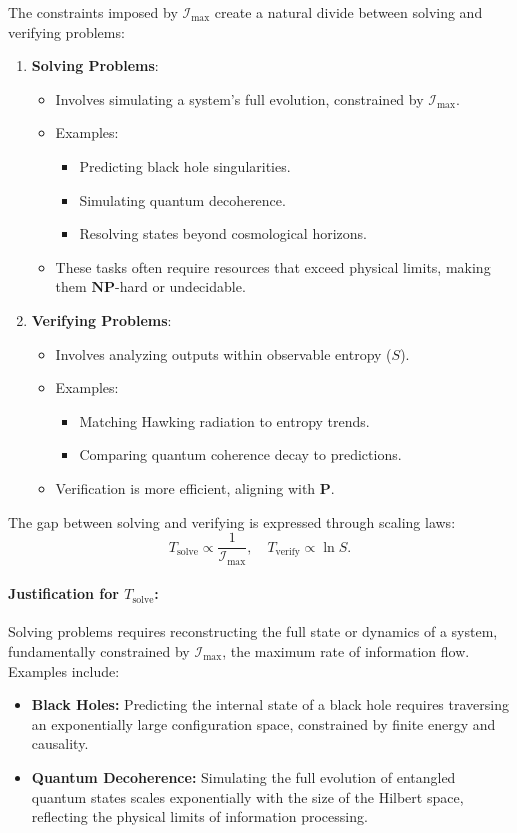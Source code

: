\documentclass[12pt]{article}
\begin{document}
The constraints imposed by \(\mathcal{I}_{\text{max}}\) create a natural divide between solving and verifying problems:
\begin{enumerate}
    \item \textbf{Solving Problems}:
    \begin{itemize}
        \item Involves simulating a system’s full evolution, constrained by \(\mathcal{I}_{\text{max}}\).
        \item Examples:
        \begin{itemize}
            \item Predicting black hole singularities.
            \item Simulating quantum decoherence.
            \item Resolving states beyond cosmological horizons.
        \end{itemize}
        \item These tasks often require resources that exceed physical limits, making them \(\mathbf{NP}\)-hard or undecidable.
    \end{itemize}

    \item \textbf{Verifying Problems}:
    \begin{itemize}
        \item Involves analyzing outputs within observable entropy (\(S\)).
        \item Examples:
        \begin{itemize}
            \item Matching Hawking radiation to entropy trends.
            \item Comparing quantum coherence decay to predictions.
        \end{itemize}
        \item Verification is more efficient, aligning with \(\mathbf{P}\).
    \end{itemize}
\end{enumerate}

The gap between solving and verifying is expressed through scaling laws:
\[
T_{\text{solve}} \propto \frac{1}{\mathcal{I}_{\text{max}}}, \quad T_{\text{verify}} \propto \ln S.
\]

\paragraph{Justification for $T_{\text{solve}}$:}
Solving problems requires reconstructing the full state or dynamics of a system, fundamentally constrained by $\mathcal{I}_{\text{max}}$, the maximum rate of information flow. Examples include:
\begin{itemize}
    \item \textbf{Black Holes:} Predicting the internal state of a black hole requires traversing an exponentially large configuration space, constrained by finite energy and causality.
    \item \textbf{Quantum Decoherence:} Simulating the full evolution of entangled quantum states scales exponentially with the size of the Hilbert space, reflecting the physical limits of information processing.
\end{itemize}
\end{document}
